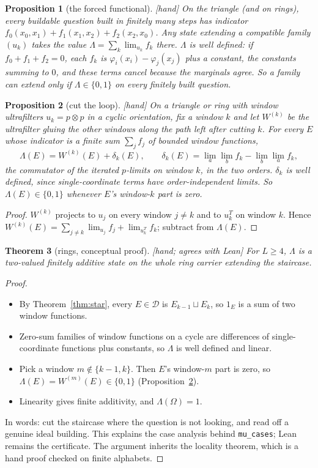 \documentclass[11pt]{article}
\theoremstyle{plain}
\newtheorem{theorem}{Theorem}[section]
\newtheorem{proposition}[theorem]{Proposition}
\theoremstyle{definition}
\newcommand{\cD}{\mathcal{D}}
\newcommand{\st}[1]{\textsf{\small[#1]}}
\begin{document}
\begin{proposition}[the forced functional]\label{prop:forced}\st{hand}
On the triangle (and on rings), every buildable question built in finitely many
steps has indicator $f_0(x_0,x_1)+f_1(x_1,x_2)+f_2(x_2,x_0)$. Any state extending
a compatible family $(u_k)$ takes the value
$\Lambda=\sum_k\lim_{u_k}f_k$ there. $\Lambda$ is well defined: if
$f_0+f_1+f_2=0$, each $f_k$ is $\varphi_i(x_i)-\varphi_j(x_j)$ plus a constant,
the constants summing to $0$, and these terms cancel because the marginals
agree. So a family can extend only if $\Lambda\in\{0,1\}$ on every finitely
built question.
\end{proposition}

\begin{proposition}[cut the loop]\label{prop:cut}\st{hand}
On a triangle or ring with window ultrafilters $u_k=p\otimes p$ in a cyclic
orientation, fix a window $k$ and let $W^{(k)}$ be the ultrafilter gluing the
other windows along the path left after cutting $k$. For every $E$ whose
indicator is a finite sum $\sum_jf_j$ of bounded window functions,
\[ \Lambda(E)=W^{(k)}(E)+\delta_k(E),\qquad
\delta_k(E)=\lim_a\lim_bf_k-\lim_b\lim_af_k, \]
the commutator of the iterated $p$-limits on window $k$, in the two orders.
$\delta_k$ is well defined, since single-coordinate terms have order-independent
limits. So $\Lambda(E)\in\{0,1\}$ whenever $E$'s window-$k$ part is zero.
\end{proposition}
\begin{proof}
$W^{(k)}$ projects to $u_j$ on every window $j\neq k$ and to $u_k^{T}$ on window
$k$. Hence $W^{(k)}(E)=\sum_{j\ne k}\lim_{u_j}f_j+\lim_{u_k^T}f_k$; subtract from
$\Lambda(E)$.
\end{proof}

\begin{theorem}[rings, conceptual proof]\label{thm:ringconcept}\st{hand; agrees with Lean}
For $L\ge4$, $\Lambda$ is a two-valued finitely additive state on the whole ring
carrier extending the staircase.
\end{theorem}
\begin{proof}
\begin{itemize}[nosep]
  \item By Theorem~\ref{thm:star}, every $E\in\cD$ is $E_{k-1}\sqcup E_k$, so
    $1_E$ is a sum of two window functions.
  \item Zero-sum families of window functions on a cycle are differences of
    single-coordinate functions plus constants, so $\Lambda$ is well defined and
    linear.
  \item Pick a window $m\notin\{k-1,k\}$. Then $E$'s window-$m$ part is zero, so
    $\Lambda(E)=W^{(m)}(E)\in\{0,1\}$ (Proposition~\ref{prop:cut}).
  \item Linearity gives finite additivity, and $\Lambda(\Omega)=1$.
\end{itemize}
In words: cut the staircase where the question is not looking, and read off a
genuine ideal building. This explains the case analysis behind
\texttt{mu\_cases}; Lean remains the certificate. The argument inherits the
locality theorem, which is a hand proof checked on finite alphabets.
\end{proof}
\end{document}

